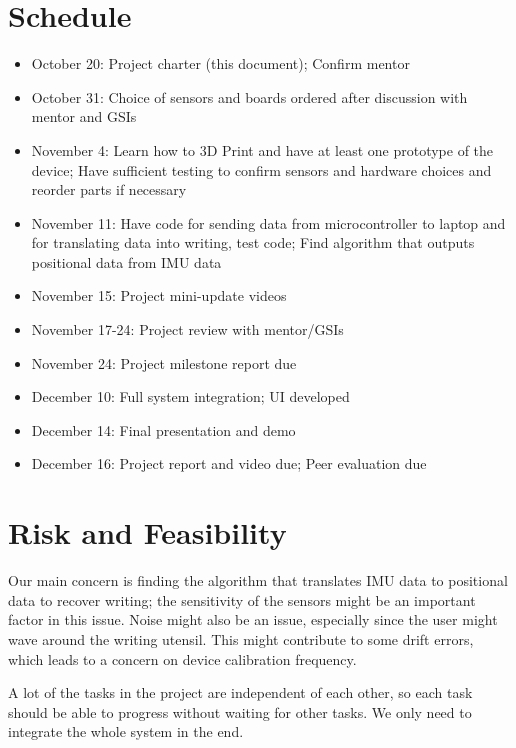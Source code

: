 \documentclass[12pt,journal]{IEEEtran}
\begin{document}
\newpage

\section{Schedule}
\begin{itemize}
\item October 20: Project charter (this document); Confirm mentor
\item October 31: Choice of sensors and boards ordered after discussion with mentor and GSIs
\item November 4: Learn how to 3D Print and have at least one prototype of the device; Have sufficient testing to confirm sensors and hardware choices and reorder parts if necessary
\item November 11: Have code for sending data from microcontroller to laptop and for translating data into writing, test code; Find algorithm that outputs positional data from IMU data
\item November 15: Project mini-update videos
\item November 17-24: Project review with mentor/GSIs
\item November 24: Project milestone report due
\item December 10: Full system integration; UI developed
\item December 14: Final presentation and demo
\item December 16: Project report and video due; Peer evaluation due
\end{itemize}


\section{Risk and Feasibility}
Our main concern is finding the algorithm that translates IMU data to positional data to recover writing; the sensitivity of the sensors might be an important factor in this issue. Noise might also be an issue, especially since the user might wave around the writing utensil. This might contribute to some drift errors, which leads to a concern on device calibration frequency. 

A lot of the tasks in the project are independent of each other, so each task should be able to progress without waiting for other tasks. We only need to integrate the whole system in the end.


\end{document}
